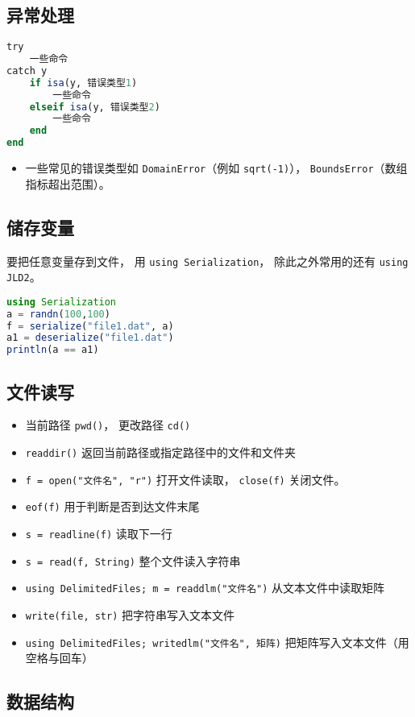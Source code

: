 \subsection{异常处理}
\begin{lstlisting}[language=julia]
try 
    一些命令
catch y
    if isa(y, 错误类型1)
        一些命令
    elseif isa(y, 错误类型2)
        一些命令
    end
end
\end{lstlisting}
\begin{itemize}
\item 一些常见的错误类型如 \verb`DomainError`（例如 \verb`sqrt(-1)`）， \verb`BoundsError`（数组指标超出范围）。
\end{itemize}


\subsection{储存变量}
要把任意变量存到文件， 用 \verb`using Serialization`， 除此之外常用的还有 \verb`using JLD2`。
\begin{lstlisting}[language=julia]
using Serialization
a = randn(100,100)
f = serialize("file1.dat", a)
a1 = deserialize("file1.dat")
println(a == a1)
\end{lstlisting}

\subsection{文件读写}
\begin{itemize}
\item 当前路径 \verb`pwd()`， 更改路径 \verb`cd()`
\item \verb`readdir()` 返回当前路径或指定路径中的文件和文件夹
\item \verb`f = open("文件名", "r")` 打开文件读取， \verb`close(f)` 关闭文件。
\item \verb`eof(f)` 用于判断是否到达文件末尾
\item \verb`s = readline(f)` 读取下一行
\item \verb`s = read(f, String)` 整个文件读入字符串
\item \verb`using DelimitedFiles; m = readdlm("文件名")` 从文本文件中读取矩阵
\item \verb`write(file, str)` 把字符串写入文本文件
\item \verb`using DelimitedFiles; writedlm("文件名", 矩阵)` 把矩阵写入文本文件（用空格与回车）
\end{itemize}

\subsection{数据结构}
